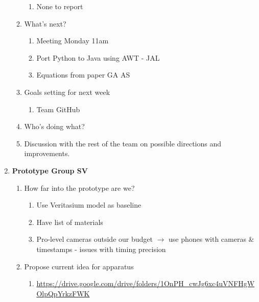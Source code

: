 \begin{enumerate}
\begin{enumerate}
\begin{enumerate}
\item  None to report
\end{enumerate}

\item  What's next? 

\begin{enumerate}
\item  Meeting Monday 11am

\item  Port Python to Java using AWT - JAL

\item  Equations from paper GA AS
\end{enumerate}

\item  Goals setting for next week

\begin{enumerate}
\item  Team GitHub
\end{enumerate}

\item  Who's doing what? 

\item  Discussion with the rest of the team on possible directions and improvements. \\
\end{enumerate}

\item  \textbf{Prototype Group SV}

\begin{enumerate}
\item \textbf{ }How far into the prototype are we? 

\begin{enumerate}
\item  Use Veritasium model as baseline

\item  Have list of materials

\item  Pro-level cameras outside our budget $\mathrm{\to}$ use phones with cameras \& timestamps - issues with timing precision
\end{enumerate}

\item  Propose current idea for apparatus

\begin{enumerate}
\item \url{ https://drive.google.com/drive/folders/1OnPH\_cwJg6xc4uVNFHgWOlpQpYrkzFWK}


\end{enumerate}
\end{enumerate}
\end{enumerate}
